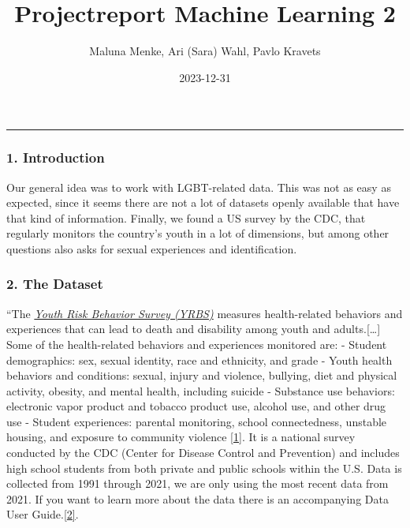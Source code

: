 \documentclass[
]{article}
\title{Projectreport Machine Learning 2}
\author{Maluna Menke, Ari (Sara) Wahl, Pavlo Kravets}
\date{2023-12-31}
\begin{document}
\maketitle

{
\setcounter{tocdepth}{6}
\tableofcontents
}
\newpage
{} 
\centering
\raggedright
\newpage

\begin{center}\rule{0.5\linewidth}{0.5pt}\end{center}

\hypertarget{introduction}{%
\subsubsection{1. Introduction}\label{introduction}}

Our general idea was to work with LGBT-related data. This was not as
easy as expected, since it seems there are not a lot of datasets openly
available that have that kind of information. Finally, we found a US
survey by the CDC, that regularly monitors the country's youth in a lot
of dimensions, but among other questions also asks for sexual
experiences and identification.

\hypertarget{the-dataset}{%
\subsubsection{2. The Dataset}\label{the-dataset}}

\hfill\break
``The
\emph{\href{https://www.cdc.gov/healthyyouth/data/yrbs/data.htm}{Youth
Risk Behavior Survey (YRBS)}} measures health-related behaviors and
experiences that can lead to death and disability among youth and
adults.{[}\ldots{]} Some of the health-related behaviors and experiences
monitored are: - Student demographics: sex, sexual identity, race and
ethnicity, and grade - Youth health behaviors and conditions: sexual,
injury and violence, bullying, diet and physical activity, obesity, and
mental health, including suicide - Substance use behaviors: electronic
vapor product and tobacco product use, alcohol use, and other drug use -
Student experiences: parental monitoring, school connectedness, unstable
housing, and exposure to community violence
\protect\hyperlink{1}{{[}1{]}}. It is a national survey conducted by the
CDC (Center for Disease Control and Prevention) and includes high school
students from both private and public schools within the U.S. Data is
collected from 1991 through 2021, we are only using the most recent data
from 2021. If you want to learn more about the data there is an
accompanying Data User Guide.\protect\hyperlink{2}{{[}2{]}}.
\end{document}

